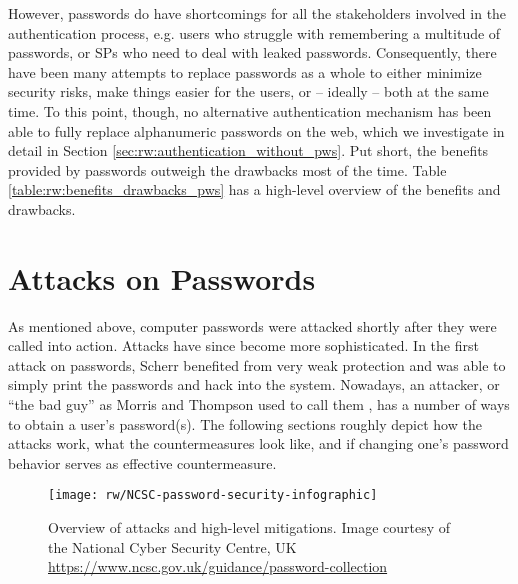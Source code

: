 However, passwords do have shortcomings for all the stakeholders involved in the authentication process, e.g. users who struggle with remembering a multitude of passwords, or \glspl{SP} who need to deal with leaked passwords. Consequently, there have been many attempts to replace passwords as a whole to either minimize security risks, make things easier for the users, or -- ideally -- both at the same time. To this point, though, no alternative authentication mechanism has been able to fully replace alphanumeric passwords on the web, which we investigate in detail in Section \ref{sec:rw:authentication_without_pws}. Put short, the benefits provided by passwords outweigh the drawbacks most of the time. Table \ref{table:rw:benefits_drawbacks_pws} has a high-level overview of the benefits and drawbacks.




\section{Attacks on Passwords}\label{sec:rw:attack_vectors}
As mentioned above, computer passwords were attacked shortly after they were called into action. Attacks have since become more sophisticated. In the first attack on passwords, Scherr benefited from very weak protection and was able to simply print the passwords and hack into the system. Nowadays, an attacker, or ``the bad guy'' as Morris and Thompson used to call them \cite{Morris1979PasswordSecurity}, has a number of ways to obtain a user's password(s). The following sections roughly depict how the attacks work, what the countermeasures look like, and if changing one's password behavior serves as effective countermeasure. 


\begin{figure}[h!]
	\centering
	\texttt{[image: rw/NCSC-password-security-infographic]}
	\caption{
		\label{fig:rw:attacks_infographic}
		Overview of attacks and high-level mitigations. Image courtesy of the National Cyber Security Centre, UK \protect\url{https://www.ncsc.gov.uk/guidance/password-collection} \protect{}
	}
\end{figure}


